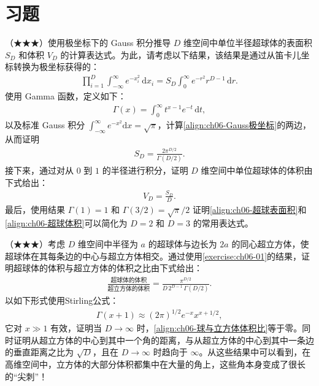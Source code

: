 \documentclass[../../main.tex]{subfiles}
\begin{document}
\section{习题}\label{section:ch06-习题}

\begin{exercise}\label{exercise:ch06-01}
（★★★）使用极坐标下的 Gauss 积分推导 $D$ 维空间中单位半径超球体的表面积 $S_D$ 和体积 $V_D$ 的计算表达式。为此，请考虑以下结果，该结果是通过从笛卡儿坐标转换为极坐标获得的：
\begin{align}
\prod_{i=1}^{D}\int_{-\infty}^{\infty}e^{-x_i^{2}}\,\mathrm{d}x_i=S_D\int_0^{\infty}e^{-r^{2}}r^{D-1}\,\mathrm{d}r .
\label{align:ch06-Gauss极坐标}
\end{align}
使用 Gamma 函数，定义如下：
\begin{align}
\Gamma(x)=\int_0^{\infty}t^{x-1}e^{-t}\,\mathrm{d}t,
\label{align:ch06-Gamma函数}
\end{align}
以及标准 Gauss 积分 $\int_{-\infty}^{\infty}e^{-x^{2}}\mathrm{d}x=\sqrt{\pi}$，计算\eqref{align:ch06-Gauss极坐标}的两边，从而证明
\begin{align}
S_D=\frac{2\pi^{D/2}}{\Gamma(D/2)} .
\label{align:ch06-超球表面积}
\end{align}
接下来，通过对从 $0$ 到 $1$ 的半径进行积分，证明 $D$ 维空间中单位超球体的体积由下式给出：
\begin{align}
V_D=\frac{S_D}{D} .
\label{align:ch06-超球体积}
\end{align}
最后，使用结果 $\Gamma(1)=1$ 和 $\Gamma(3/2)=\sqrt{\pi}/2$ 证明\eqref{align:ch06-超球表面积}和\eqref{align:ch06-超球体积}可以简化为 $D=2$ 和 $D=3$ 的常用表达式。
\end{exercise}

\begin{exercise}\label{exercise:ch06-02}
（★★★）考虑 $D$ 维空间中半径为 $a$ 的超球体与边长为 $2a$ 的同心超立方体，使超球体在其每条边的中心与超立方体相交。通过使用\cref{exercise:ch06-01}的结果，证明超球体的体积与超立方体的体积之比由下式给出：
\begin{align}
\frac{\text{超球体的体积}}{\text{超立方体的体积}}=\frac{\pi^{D/2}}{D\,2^{D-1}\,\Gamma(D/2)} .
\label{align:ch06-球与立方体体积比}
\end{align}
以如下形式使用Stirling公式：
\begin{align}
\Gamma(x+1)\approx(2\pi)^{1/2}e^{-x}x^{x+1/2},
\label{align:ch06-Stirling}
\end{align}
它对 $x\gg1$ 有效，证明当 $D\to\infty$ 时，\eqref{align:ch06-球与立方体体积比}等于零。同时证明从超立方体的中心到其中一个角的距离，与从超立方体的中心到其中一条边的垂直距离之比为 $\sqrt{D}$，且在 $D\to\infty$ 时趋向于 $\infty$。从这些结果中可以看到，在高维空间中，立方体的大部分体积都集中在大量的角上，这些角本身变成了很长的“尖刺”！
\end{exercise}
\end{document}

